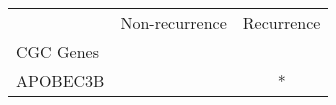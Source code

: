 \begin{tabular}{lcc}
\toprule
{} & Non-recurrence & Recurrence \\
CGC Genes &                &            \\
\midrule
APOBEC3B  &                &          * \\
\bottomrule
\end{tabular}
